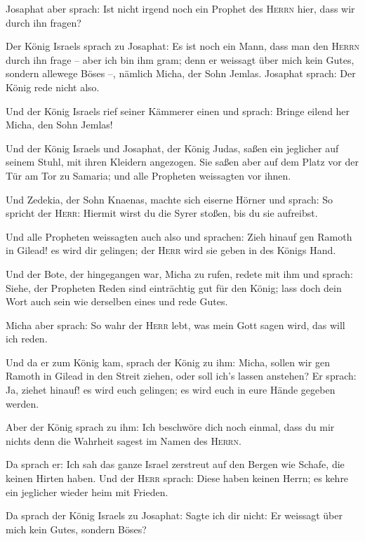  Josaphat aber sprach: Ist nicht irgend noch ein Prophet
des \textsc{Herrn} hier, dass wir durch ihn fragen?

 Der König Israels sprach zu Josaphat: Es ist noch ein
Mann, dass man den \textsc{Herrn} durch ihn frage -- aber ich bin ihm
gram; denn er weissagt über mich kein Gutes, sondern allewege Böses --,
nämlich Micha, der Sohn Jemlas. Josaphat sprach: Der König rede nicht
also.

 Und der König Israels rief seiner Kämmerer einen und
sprach: Bringe eilend her Micha, den Sohn Jemlas!

 Und der König Israels und Josaphat, der König Judas,
saßen ein jeglicher auf seinem Stuhl, mit ihren Kleidern angezogen. Sie
saßen aber auf dem Platz vor der Tür am Tor zu Samaria; und alle
Propheten weissagten vor ihnen.

 Und Zedekia, der Sohn Knaenas, machte sich eiserne
Hörner und sprach: So spricht der \textsc{Herr}: Hiermit wirst du die
Syrer stoßen, bis du sie aufreibst.

 Und alle Propheten weissagten auch also und sprachen:
Zieh hinauf gen Ramoth in Gilead! es wird dir gelingen; der
\textsc{Herr} wird sie geben in des Königs Hand.

 Und der Bote, der hingegangen war, Micha zu rufen,
redete mit ihm und sprach: Siehe, der Propheten Reden sind einträchtig
gut für den König; lass doch dein Wort auch sein wie derselben eines und
rede Gutes.

 Micha aber sprach: So wahr der \textsc{Herr} lebt, was
mein Gott sagen wird, das will ich reden.

 Und da er zum König kam, sprach der König zu ihm: Micha,
sollen wir gen Ramoth in Gilead in den Streit ziehen, oder soll ich's
lassen anstehen? Er sprach: Ja, ziehet hinauf! es wird euch gelingen; es
wird euch in eure Hände gegeben werden.

 Aber der König sprach zu ihm: Ich beschwöre dich noch
einmal, dass du mir nichts denn die Wahrheit sagest im Namen des
\textsc{Herrn}.

 Da sprach er: Ich sah das ganze Israel zerstreut auf den
Bergen wie Schafe, die keinen Hirten haben. Und der \textsc{Herr}
sprach: Diese haben keinen Herrn; es kehre ein jeglicher wieder heim mit
Frieden.

 Da sprach der König Israels zu Josaphat: Sagte ich dir
nicht: Er weissagt über mich kein Gutes, sondern Böses?

